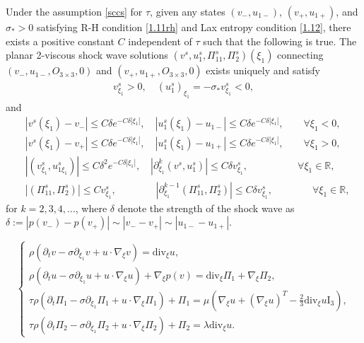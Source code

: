 \documentclass[10pt,a4paper]{amsart}
\newcommand{\ddiv}{\mathrm{div}}
\begin{document}
\begin{lemma}\label{pvsw}
Under the assumption \eqref{sccs} for $\tau$, given any states $(v_-,u_{1-})$, $(v_+,u_{1+})$, and $\sigma_\ast>0$ satisfying R-H condition \eqref{1.11rh} and Lax  entropy condition \eqref{1.12}, there exists a positive constant $C$ independent of $\tau$ such that the following is true. The planar 2-viscous shock wave solutions $(v^s,u_{1}^s,\Pi_{11}^s,\Pi_2^s)(\xi_1)$ connecting $(v_-, u_{1-}, O_{3\times3}, 0)$ and $(v_+, u_{1+}, O_{3\times3}, 0)$ exists uniquely and satisfy
\begin{align*}
v^s_{\xi_1}>0,\quad
(u_1^s)_{\xi_1}=-\sigma_\ast v^s_{\xi_1}<0,
\end{align*}
and
\begin{align*}
&|v^s(\xi_1)-v_-|\leq C\delta e^{-C\delta|\xi_1|},\quad
|u_1^s(\xi_1)-u_{1-}|\leq C\delta e^{-C\delta|\xi_1|},\qquad  \forall \xi_1<0,\\
&|v^s(\xi_1)-v_+|\leq C\delta e^{-C\delta|\xi_1|},\quad
|u_1^s(\xi_1)-u_{1+}|\leq C\delta e^{-C\delta|\xi_1|},\qquad  \forall \xi_1>0,\\
&|(v^s_{\xi_1},u^s_{1\xi_1})|\le C\delta^2e^{-C\delta|\xi_1|},\quad
|\partial_{\xi_1}^{k}(v^s, u_1^s)| \le C\delta v^s_{\xi_1},\quad\quad\qquad\quad
\forall \xi_1\in\mathbb{R},\\
&|(\Pi^s_{11}, \Pi^s_2)|\le Cv^s_{\xi_1},\qquad\qquad
|\partial^{k-1}_{\xi_1}(\Pi^s_{11}, \Pi^s_2)|\le C\delta v^s_{\xi_1},
\qquad\quad\quad\forall\xi_1\in\mathbb{R},
\end{align*}
for $k=2,3,4,...$, where $\delta$ denote the strength of the shock wave as $\delta:=|p(v_-)-p(v_+)|\sim|v_--v_+|\sim|u_{1-}-u_{1+}|$.
\end{lemma}

\begin{equation}\label{3.1}
\begin{cases}
\rho\left(\partial_tv-\sigma\partial_{\xi_1}v+u\cdot\nabla_{\xi} v\right)=\ddiv_{\xi} u,\\
\rho\left(\partial_tu-\sigma\partial_{\xi_1}u+u\cdot\nabla_{\xi} u\right)+\nabla_{\xi}p(v)=\ddiv_{\xi}\Pi_1+\nabla_{\xi}\Pi_2,\\
\tau\rho\left(\partial_t\Pi_1-\sigma\partial_{\xi_1}\Pi_1+u\cdot\nabla_{\xi} \Pi_1\right)+\Pi_1
   =\mu\left(\nabla_{\xi} u+(\nabla_{\xi} u)^T-\frac{2}{3}\ddiv_{\xi} u \mathrm I_3\right),\\
\tau\rho\left(\partial_t\Pi_2-\sigma\partial_{\xi_1}\Pi_2+u\cdot\nabla_{\xi}\Pi_2\right)+\Pi_2
=\lambda\ddiv_{\xi} u.
\end{cases}
\end{equation}
\end{document}
